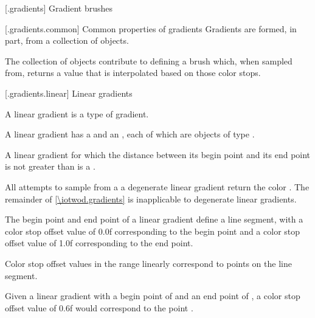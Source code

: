  [\iotwod.gradients] {Gradient brushes}

 [\iotwod.gradients.common] {Common properties of gradients}
\pnum
Gradients are formed, in part, from a collection of  objects.

\pnum
The collection of  objects contribute to defining a brush which, when sampled from, returns a value that is interpolated based on those color stops.

 [\iotwod.gradients.linear] {Linear gradients}

\pnum
A linear gradient is a type of gradient.

\pnum
A linear gradient has a  and an , each of which are objects of type .

\pnum
A linear gradient for which the distance between its begin point and its end point is not greater than  is a .

\pnum
All attempts to sample from a a degenerate linear gradient return the color . The remainder of \ref{\iotwod.gradients} is inapplicable to degenerate linear gradients.

\pnum
The begin point and end point of a linear gradient define a line segment, with a color stop offset value of 0.0f corresponding to the begin point and a color stop offset value of 1.0f corresponding to the end point.

\pnum
Color stop offset values in the range  linearly correspond to points on the line segment.

\pnum
\begin{example}
Given a linear gradient with a begin point of  and an end point of , a color stop offset value of 0.6f would correspond to the point .
\end{example}

